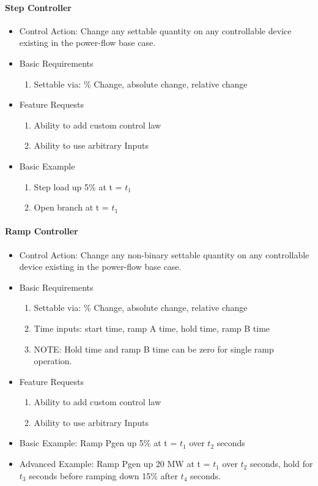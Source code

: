 \documentclass[12pt]{article}
\begin{document}
\begin{multicols}{2}
	
\paragraph{Step Controller}
\begin{itemize}
	\item Control Action: Change any settable quantity on any controllable device existing in the power-flow base case.
	\item Basic Requirements
	\begin{enumerate}
		\item Settable via: \% Change, absolute change, relative change
	\end{enumerate}
	\item Feature Requests
	\begin{enumerate}
		\item Ability to add custom control law
		\item Ability to use arbitrary Inputs
	\end{enumerate}
	\item Basic Example 
	\begin{enumerate}
		\item Step load up 5\% at t = $t_1$
		\item Open branch at t = $t_1$
	\end{enumerate}
\end{itemize}

\paragraph{Ramp Controller}
\begin{itemize}
	\item Control Action: Change any non-binary settable quantity on any controllable device existing in the power-flow base case.
	\item Basic Requirements
	\begin{enumerate}
		\item Settable via: \% Change, absolute change, relative change
		\item Time inputs: start time, ramp A time, hold time, ramp B time
		\item NOTE: Hold time and ramp B time can be zero for single ramp operation.
	\end{enumerate}
	\item Feature Requests
	\begin{enumerate}
		\item Ability to add custom control law
		\item Ability to use arbitrary Inputs
	\end{enumerate}
	\item Basic Example: Ramp Pgen up 5\% at t = $t_1$ over $t_2$ seconds
	\item Advanced Example: Ramp Pgen up 20 MW at t = $t_1$ over $t_2$ seconds, hold for $t_3$ seconds before ramping down 15\% after $t_4$ seconds.
\end{itemize}


\end{multicols}
\end{document}
